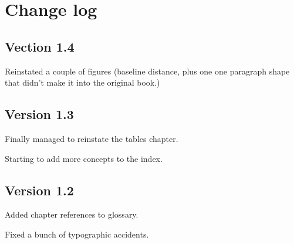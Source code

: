 
\chapter*{Change log}

\section*{Vection 1.4}

Reinstated a couple of figures (baseline distance,
plus one one paragraph shape that didn't make it
into the original book.)

\section*{Version 1.3}

Finally managed to reinstate the tables chapter.

Starting to add more concepts to the index.

\section*{Version 1.2}

Added chapter references to glossary.

Fixed a bunch of typographic accidents.

